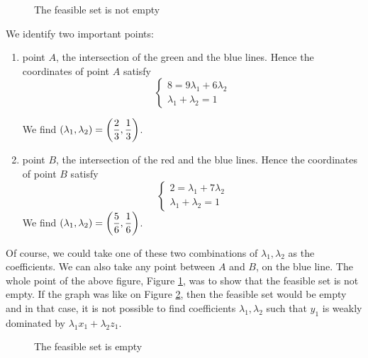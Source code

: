   


\begin{figure}[h]
    
    \caption{The feasible set is not empty}
    \label{fig:feasProb}
\end{figure}


We identify two important points:
\begin{enumerate}
    \item point $A$, the intersection of the green and the blue lines. Hence the coordinates of point $A$ satisfy
    \begin{equation*}
       \begin{cases}
        8 = 9 \lambda_{1} + 6 \lambda_{2}  \\
        \lambda_{1} + \lambda_{2} = 1
        \end{cases} 
    \end{equation*}
    
    We find $\left( \lambda_{1},\lambda_{2} \right) = \left( \dfrac{2}{3},\dfrac{1}{3} \right) $.
    
    \item point $B$, the intersection of the red and the blue lines. Hence the coordinates of point $B$ satisfy
    \begin{equation*}
    \begin{cases}
    2 = \lambda_{1} + 7 \lambda_{2}  \\
    \lambda_{1} + \lambda_{2} = 1
    \end{cases}
    \end{equation*}
    We find $\left( \lambda_{1},\lambda_{2} \right) = \left( \dfrac{5}{6},\dfrac{1}{6} \right) $.
\end{enumerate}
    
Of course, we could take one of these two combinations of $\lambda_{1},\lambda_{2}$ as the coefficients. We can also take any point between $A$ and $B$, on the blue line. The whole point of the above figure, Figure \ref{fig:feasProb}, was to show that the feasible set is not empty. If the graph was like on Figure \ref{fig:unFeasProb}, then the feasible set would be empty and in that case, it is not possible to find coefficients $\lambda_{1},\lambda_{2}$ such that $y_1$ is weakly dominated by $\lambda_{1} x_{1} + \lambda_{2} z_{1}$.


\begin{figure}[h!]
    \centering
   
    
    \caption{The feasible set is empty}
    \label{fig:unFeasProb}
\end{figure}



